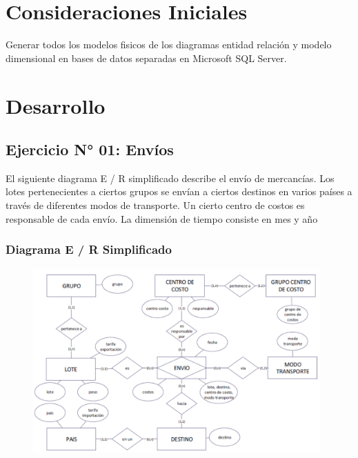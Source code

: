 \documentclass[12pt,letterpaper]{article}
\begin{document}
\section{Consideraciones Iniciales}
Generar todos los modelos fisicos de los diagramas entidad relación y modelo dimensional en bases de datos separadas en Microsoft SQL Server.

\newpage

\section{Desarrollo}


\subsection{Ejercicio N° 01: Envíos}

El siguiente diagrama E / R simplificado describe el envío de mercancías. Los lotes pertenecientes a ciertos grupos se envían a ciertos destinos en varios países a través de diferentes modos de transporte. Un cierto centro de costos es responsable de cada envío. La dimensión de tiempo consiste en mes y año


\subsubsection{\textbf{Diagrama E / R Simplificado}}

	\begin{figure}[htb]
		\begin{center}
			\includegraphics[width=11cm]{./IMAGENES/Ejercicio_1}
			
		\end{center}
	\end{figure}
\end{document}
